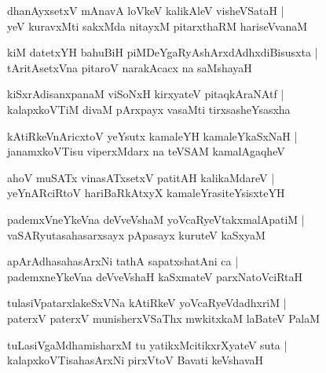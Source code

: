 \documentclass[twoside,12pt,openright]{book}
\newcounter{shloka}[chapter]
\begin{document}
\begin{shloka}%
dhanAyxsetxV mAnavA loVkeV kalikAleV visheVSataH |\\
yeV kuravxMti sakxMda nitayxM pitarxthaRM hariseVvanaM 
\end{shloka}

\begin{shloka}%
kiM datetxYH bahuBiH piMDeYgaRyAshArxdAdhxdiBisusxta |\\
tAritAsetxVna pitaroV narakAcacx na saMshayaH 
\end{shloka}

\begin{shloka}%
kiSxrAdisanxpanaM viSoNxH kirxyateV pitaqkAraNAtf |\\
kalapxkoVTiM divaM pArxpayx vasaMti tirxsasheYsasxha 
\end{shloka}

\begin{shloka}%
kAtiRkeVnAricxtoV yeYsutx kamaleYH kamaleYkaSxNaH |\\
janamxkoVTisu viperxMdarx na teVSAM kamalAgaqheV 
\end{shloka}

\begin{shloka}%
ahoV muSATx vinasATxsetxV patitAH kalikaMdareV |\\
yeYnARciRtoV hariBaRkAtxyX kamaleYrasiteYsisxteYH 
\end{shloka}

\begin{shloka}%
pademxVneYkeVna deVveVshaM yoVcaRyeVtakxmalApatiM |\\
vaSARyutasahasarxsayx pApasayx kuruteV kaSxyaM 
\end{shloka}

\begin{shloka}%
apArAdhasahasArxNi tathA sapatxshatAni ca |\\
pademxneYkeVna deVveVshaH kaSxmateV parxNatoVciRtaH 
\end{shloka}

\begin{shloka}%
tulasiVpatarxlakeSxVNa kAtiRkeV yoVcaRyeVdadhxriM |\\
paterxV paterxV munisherxVSaThx mwkitxkaM laBateV PalaM
\end{shloka}

\begin{shloka}%
tuLasiVgaMdhamisharxM tu yatikxMcitikxrXyateV suta |\\
kalapxkoVTisahasArxNi pirxVtoV Bavati keVshavaH
\end{shloka}
\end{document}
